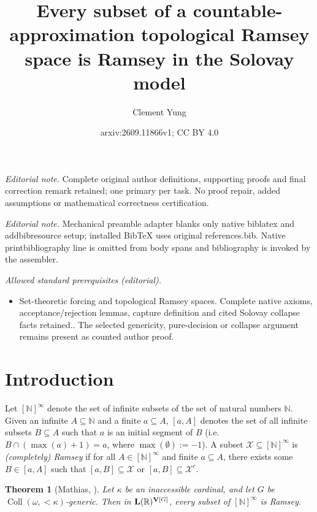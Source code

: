 \documentclass[10pt,a4paper]{amsart}
\title{Every subset of a countable-approximation topological Ramsey space is Ramsey in the Solovay model}
\author{Clement Yung}
\date{arxiv:2609.11866v1; CC BY 4.0}
\theoremstyle{plain}
\numberwithin{equation}{section}
\newtheorem{theorem}{Theorem}[section]
\theoremstyle{definition}
\newcommand{\func}{\operatorname}
\newcommand{\R}{\mathbb{R}}
\newcommand{\N}{\mathbb{N}}
\newcommand{\cal}{\mathcal}
\renewcommand{\bf}{\mathbf}
\newcommand{\Coll}{\func{Coll}}
\newcommand{\V}{\bf{V}}
\newcommand{\X}{\cal{X}}
\DeclareRobustCommand{\L}{\ifmmode\mathbf{L}\else\strokeL\fi}
\begin{document}
\maketitle
\noindent\textit{Editorial note.} Complete original author definitions, supporting proofs and final correction remark retained; one primary per task. No proof repair, added assumptions or mathematical correctness certification.\par\medskip
\noindent\textit{Editorial note.} Mechanical preamble adapter blanks only native biblatex and addbibresource setup; installed BibTeX uses original references.bib. Native printbibliography line is omitted from body spans and bibliography is invoked by the assembler.\par\medskip
\noindent\textit{Allowed standard prerequisites (editorial).}\begin{itemize}
\item Set-theoretic forcing and topological Ramsey spaces. Complete native axioms, acceptance/rejection lemmas, capture definition and cited Solovay collapse facts retained.. The selected genericity, pure-decision or collapse argument remains present as counted author proof.
\end{itemize}\medskip
\section{Introduction}
\label{sec:intro}
Let $[\N]^\infty$ denote the set of infinite subsets of the set of natural numbers $\N$. Given an infinite $A \subseteq \N$ and a finite $a \subseteq A$, $[a,A]$ denotes the set of all infinite subsets $B \subseteq A$ such that $a$ is an initial segment of $B$ (i.e. $B \cap (\max(a) + 1) = a$, where $\max(\emptyset) := -1$). A subset $\X \subseteq [\N]^\infty$ is \emph{(completely) Ramsey} if for all $A \in [\N]^\infty$ and finite $a \subseteq A$, there exists some $B \in [a,A]$ such that $[a,B] \subseteq \X$ or $[a,B] \subseteq \X^c$. 

\begin{theorem}[Mathias, \cite{M77}]
\label{thm:Mathias}
    Let $\kappa$ be an inaccessible cardinal, and let $G$ be $\Coll(\omega,{<}\kappa)$-generic. Then in $\L(\R)^{\V[G]}$, every subset of $[\N]^\infty$ is Ramsey.
\end{theorem}
\end{document}
